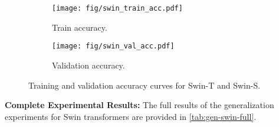 \begin{figure*}[h]
\vskip 0.1in
\begin{center}
\begin{subfigure}{0.45\linewidth}
    \centering
    \texttt{[image: fig/swin\_train\_acc.pdf]}
    \caption{\small Train accuracy.}
    \label{fig:swin_train_acc}
\end{subfigure}
\hfill
\begin{subfigure}{0.45\linewidth}
    \centering
    \texttt{[image: fig/swin\_val\_acc.pdf]}
    \caption{\small Validation accuracy.}
    \label{fig:swin_val_acc}
\end{subfigure}
\caption{\small Training and validation accuracy curves for Swin-T and Swin-S.}
\label{fig:swin_train_curves}
\end{center}
\vskip -0.1in
\end{figure*}

\textbf{Complete Experimental Results:} The full results of the generalization experiments for Swin transformers are provided in \cref{tab:gen-swin-full}.  

